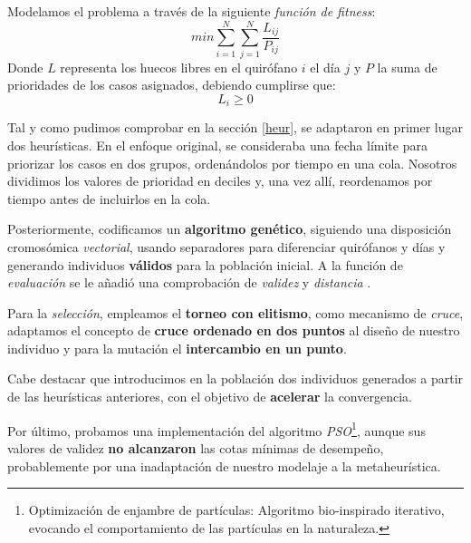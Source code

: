 Modelamos el problema a través de la siguiente \textit{función de fitness}:
\begin{equation}
    min \sum_{i=1}^{N} \sum_{j=1}^{N}\frac{L_{ij}}{P_{ij}}
\end{equation}
Donde $L$ representa los huecos libres en el quirófano $i$ el día $j$ y $P$ la suma de prioridades de los casos asignados, debiendo cumplirse que:
\begin{equation}
    L_{i}\geq 0
\end{equation}

Tal y como pudimos comprobar en la sección \ref{heur}, se adaptaron en primer lugar dos heurísticas\cite{Lin2020AScheduling}. 
En el enfoque original, se consideraba una fecha límite para priorizar los casos en dos grupos, ordenándolos por tiempo en una cola. Nosotros dividimos los valores de prioridad en deciles y, una vez allí, reordenamos por tiempo antes de incluirlos en la cola.

Posteriormente, codificamos un \textbf{algoritmo genético}, siguiendo una disposición cromosómica \textit{vectorial}, usando separadores para diferenciar quirófanos y días y generando individuos \textbf{válidos} para la población inicial.
A la función de \textit{evaluación} se le añadió una comprobación de \textit{validez} y \textit{distancia} \cite{CoelloCoello2002TheoreticalArt}.

Para la \textit{selección}, empleamos el \textbf{torneo con elitismo}, como mecanismo de \textit{cruce}, adaptamos el concepto de \textbf{cruce ordenado en dos puntos} al diseño de nuestro individuo\cite{Lin2020AScheduling} y para la mutación el \textbf{intercambio en un punto}.

 Cabe destacar que introducimos en la población dos individuos generados a partir de las heurísticas anteriores, con el objetivo de \textbf{acelerar} la convergencia.

 Por último, probamos una implementación del algoritmo \textit{PSO}\footnote{Optimización de enjambre de partículas:  Algoritmo bio-inspirado iterativo, evocando el comportamiento de las partículas en la naturaleza.}, aunque sus valores de validez \textbf{no alcanzaron }las cotas mínimas de desempeño, probablemente por una inadaptación de nuestro modelaje a la metaheurística.


